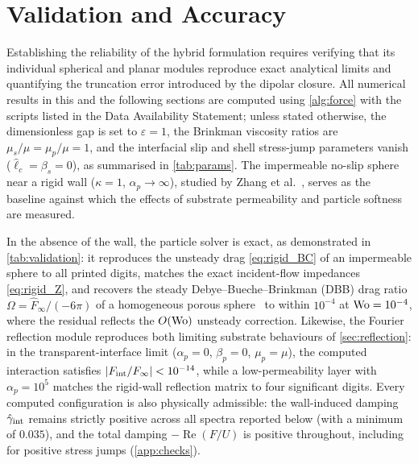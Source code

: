 \section{Validation and Accuracy}\label{sec:validation}

Establishing the reliability of the hybrid formulation requires verifying that its individual spherical and planar
modules reproduce exact analytical limits and quantifying the truncation error introduced by the dipolar closure. All
numerical results in this and the following sections are computed using \cref{alg:force} with the scripts listed in the
Data Availability Statement; unless stated otherwise, the dimensionless gap is set to $\varepsilon=1$, the Brinkman
viscosity ratios are $\mu_s/\mu=\mu_p/\mu=1$, and the interfacial slip and shell stress-jump parameters vanish
($\hat\ell_c=\beta_s=0$), as summarised in \cref{tab:params}. The impermeable no-slip sphere near a rigid wall
($\kappa=1$, $\alpha_p\to\infty$), studied by Zhang et al.~\cite{zhang2023unsteady}, serves as the baseline against which
the effects of substrate permeability and particle softness are measured.

In the absence of the wall, the particle solver is exact, as demonstrated in \cref{tab:validation}: it reproduces the
unsteady drag \cref{eq:rigid_BC} of an impermeable sphere to all printed digits, matches the exact incident-flow
impedances \cref{eq:rigid_Z}, and recovers the steady Debye--Bueche--Brinkman (DBB) drag ratio $\Omega=\hat
F_\infty/(-6\pi)$ of a homogeneous porous sphere~\cite{brinkman1949calculation} to within $10^{-4}$ at $\mathrm{Wo}=10^{-4}$, where
the residual reflects the $O(\mathrm{Wo})$ unsteady correction. Likewise, the Fourier reflection module reproduces both limiting
substrate behaviours of \cref{sec:reflection}: in the transparent-interface limit ($\alpha_p=0$, $\beta_p=0$, $\mu_p=\mu$),
the computed interaction satisfies $|F_{\rm int}/F_\infty|<10^{-14}$, while a low-permeability layer with
$\alpha_p=10^5$ matches the rigid-wall reflection matrix to four significant digits. Every computed configuration is also
physically admissible: the wall-induced damping $\hat\gamma_{\rm int}$ remains strictly positive across all spectra
reported below (with a minimum of $0.035$), and the total damping $-\operatorname{Re}(F/U)$ is positive throughout,
including for positive stress jumps (\cref{app:checks}).

